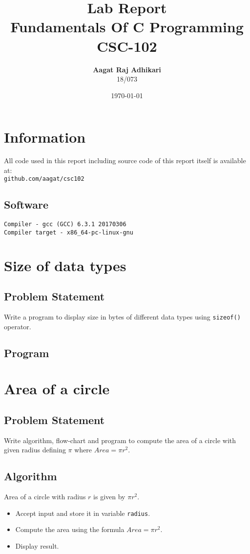\documentclass[11pt]{report}
\title{Lab Report \\
      \textbf{Fundamentals Of C Programming} \\
      CSC-102}
\author{\textbf{Aagat Raj Adhikari} \\ 18/073}
\date{\today}
\begin{document}
\maketitle

\chapter*{Information}
All code used in this report including source code of this report itself is available at:\\ \texttt{github.com/aagat/csc102}
\section*{Software}
\texttt{Compiler - gcc (GCC) 6.3.1 20170306\\
Compiler target - x86\_64-pc-linux-gnu
}

\tableofcontents

\chapter{Size of data types}
\section{Problem Statement}
Write a program to display size in bytes of different data types using \texttt{sizeof()} operator.
\section{Program}



\chapter{Area of a circle}
\section{Problem Statement}
Write algorithm, flow-chart and program to compute the area of a circle with given radius defining $\pi$ where $Area = \pi r^2$.
\section{Algorithm}
Area of a circle with radius $r$ is given by $\pi r^2$.
\begin{itemize}
\item Accept input and store it in variable \texttt{radius}.
\item Compute the area using the formula $Area = \pi r^2$.
\item Display result.
\end{itemize}
\end{document}
